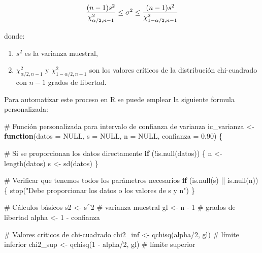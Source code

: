 \documentclass[
  spanish,
  letterpaper,
]{book}
\newenvironment{Shaded}{\begin{snugshade}}{\end{snugshade}}
\newcommand{\AttributeTok}[1]{\textcolor[rgb]{0.40,0.45,0.13}{#1}}
\newcommand{\CommentTok}[1]{\textcolor[rgb]{0.37,0.37,0.37}{#1}}
\newcommand{\ConstantTok}[1]{\textcolor[rgb]{0.56,0.35,0.01}{#1}}
\newcommand{\ControlFlowTok}[1]{\textcolor[rgb]{0.00,0.23,0.31}{\textbf{#1}}}
\newcommand{\DecValTok}[1]{\textcolor[rgb]{0.68,0.00,0.00}{#1}}
\newcommand{\FloatTok}[1]{\textcolor[rgb]{0.68,0.00,0.00}{#1}}
\newcommand{\FunctionTok}[1]{\textcolor[rgb]{0.28,0.35,0.67}{#1}}
\newcommand{\NormalTok}[1]{\textcolor[rgb]{0.00,0.23,0.31}{#1}}
\newcommand{\OtherTok}[1]{\textcolor[rgb]{0.00,0.23,0.31}{#1}}
\newcommand{\SpecialCharTok}[1]{\textcolor[rgb]{0.37,0.37,0.37}{#1}}
\newcommand{\StringTok}[1]{\textcolor[rgb]{0.13,0.47,0.30}{#1}}
\begin{document}
\[\LARGE \frac{(n-1)s^2}{\chi^2_{\alpha/2, n-1}} \leq \sigma^2 \leq \frac{(n-1)s^2}{\chi^2_{1-\alpha/2, n-1}} \]

donde:

\begin{enumerate}
\def\labelenumi{\arabic{enumi}.}
\item
  \(s^2\) es la varianza muestral,
\item
  \(\chi^2_{\alpha/2, n-1}\) y \(\chi^2_{1-\alpha/2, n-1}\) son los
  valores críticos de la distribución chi-cuadrado con \(n-1\) grados de
  libertad.
\end{enumerate}

Para automatizar este proceso en R se puede emplear la siguiente formula
personalizada:

\begin{Shaded}
\begin{Highlighting}[]
\CommentTok{\# Función personalizada para intervalo de confianza de varianza}
\NormalTok{ic\_varianza }\OtherTok{\textless{}{-}} \ControlFlowTok{function}\NormalTok{(}\AttributeTok{datos =} \ConstantTok{NULL}\NormalTok{, }\AttributeTok{s =} \ConstantTok{NULL}\NormalTok{, }\AttributeTok{n =} \ConstantTok{NULL}\NormalTok{, }\AttributeTok{confianza =} \FloatTok{0.90}\NormalTok{) \{}
  
  \CommentTok{\# Si se proporcionan los datos directamente}
  \ControlFlowTok{if}\NormalTok{ (}\SpecialCharTok{!}\FunctionTok{is.null}\NormalTok{(datos)) \{}
\NormalTok{    n }\OtherTok{\textless{}{-}} \FunctionTok{length}\NormalTok{(datos)}
\NormalTok{    s }\OtherTok{\textless{}{-}} \FunctionTok{sd}\NormalTok{(datos)}
\NormalTok{  \}}
  
  \CommentTok{\# Verificar que tenemos todos los parámetros necesarios}
  \ControlFlowTok{if}\NormalTok{ (}\FunctionTok{is.null}\NormalTok{(s) }\SpecialCharTok{||} \FunctionTok{is.null}\NormalTok{(n)) \{}
    \FunctionTok{stop}\NormalTok{(}\StringTok{"Debe proporcionar los datos o los valores de s y n"}\NormalTok{)}
\NormalTok{  \}}
  
  \CommentTok{\# Cálculos básicos}
\NormalTok{  s2 }\OtherTok{\textless{}{-}}\NormalTok{ s}\SpecialCharTok{\^{}}\DecValTok{2}  \CommentTok{\# varianza muestral}
\NormalTok{  gl }\OtherTok{\textless{}{-}}\NormalTok{ n }\SpecialCharTok{{-}} \DecValTok{1}  \CommentTok{\# grados de libertad}
\NormalTok{  alpha }\OtherTok{\textless{}{-}} \DecValTok{1} \SpecialCharTok{{-}}\NormalTok{ confianza}
  
  \CommentTok{\# Valores críticos de chi{-}cuadrado}
\NormalTok{  chi2\_inf }\OtherTok{\textless{}{-}} \FunctionTok{qchisq}\NormalTok{(alpha}\SpecialCharTok{/}\DecValTok{2}\NormalTok{, gl)        }\CommentTok{\# límite inferior}
\NormalTok{  chi2\_sup }\OtherTok{\textless{}{-}} \FunctionTok{qchisq}\NormalTok{(}\DecValTok{1} \SpecialCharTok{{-}}\NormalTok{ alpha}\SpecialCharTok{/}\DecValTok{2}\NormalTok{, gl)    }\CommentTok{\# límite superior}
  

\end{Highlighting}
\end{Shaded}
\end{document}
